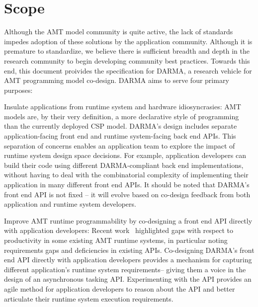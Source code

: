 \section{Scope}\label{sec:scope}
Although the \gls{AMT} model community is quite active, the lack of
standards impedes adoption of these solutions by the application community.
Although it is premature to standardize, we believe there is sufficient  
breadth and depth in the research community to begin developing community best
practices.  Towards this end, this document proivides the specification for \gls{DARMA},
a research vehicle for \gls{AMT} \gls{programming model} \gls{co-design}.  
\gls{DARMA} aims to serve four primary purposes:
\begin{compactdesc}
\item[Insulate applications from runtime system and hardware idiosyncrasies:]
  \gls{AMT} models are, by their very definition, a more \gls{declarative} style of
  programming than the currently deployed \gls{CSP} model. 
  \gls{DARMA}'s design includes separate application-facing \gls{front end} and
  \gls{runtime system}-facing \gls{back end} \glspl{API}. This separation of concerns 
  enables an application team to explore the impact of \gls{runtime system}
  design space decisions. For example, application developers can build their code using different
  \gls{DARMA}-compliant \gls{back end} implementations, without
  having to deal with the combinatorial complexity of
  implementing their application in many different \gls{front end} \glspl{API}. 
  It should be noted that \gls{DARMA}'s \gls{front end} \gls{API} is not
  fixed -- it will evolve based on \gls{co-design} feedback from both application
  and \gls{runtime system} developers. 
\item[Improve AMT runtime programmability by co-designing a front end  API directly with application developers:]
  Recent work~\cite{L2Sand2015} highlighted gaps with respect to productivity
  in some existing \gls{AMT} \glspl{runtime system}, in particular noting requirements gaps and 
  deficiencies in existing \glspl{API}. Co-designing \gls{DARMA}'s \gls{front end} \gls{API}
  directly with application developers provides a mechanism for capturing
  different application's \gls{runtime system} requirements-- giving them a voice in the design of an
  asynchronous tasking \gls{API}.  Experimenting with the \gls{API} provides an agile method for application
  developers to reason about the \gls{API} 
  and better articulate their \gls{runtime system} execution requirements.

\end{compactdesc}
